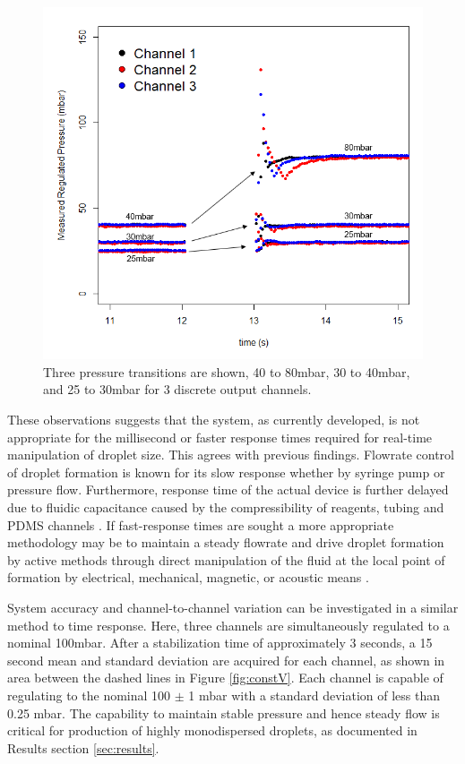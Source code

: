 \begin{figure}[H]
\centering 
\includegraphics[width=01.0\columnwidth]{timeResponse.PNG} 
\caption[PDFC time response]{Three pressure transitions are shown, 40 to 80mbar, 30 to 40mbar, and 25 to 30mbar for 3 discrete output channels. } 
\label{fig:timeResponse} 
\end{figure}

These observations suggests that the system, as currently developed, is not appropriate for the millisecond or faster response times required for real-time manipulation of droplet size. This agrees with previous findings. Flowrate control of droplet formation is known for its slow response whether by syringe pump or pressure flow. Furthermore, response time of the actual device is further delayed due to fluidic capacitance caused by the compressibility of reagents, tubing and PDMS channels \cite{Churski2013,Stone2004}. If fast-response times are sought a more appropriate methodology may be to maintain a steady flowrate and drive droplet formation by active methods through direct manipulation of the fluid at the local point of formation by electrical, mechanical, magnetic, or acoustic means \cite{Chong2016}.


System accuracy and channel-to-channel variation can be investigated in a similar method to time response. Here, three channels are simultaneously regulated to a nominal 100mbar. After a stabilization time of approximately 3 seconds, a 15 second mean and standard deviation are acquired for each channel, as shown in area between the dashed lines in Figure \vref{fig:constV}. Each channel is capable of regulating to the nominal 100 $\pm$ 1 mbar with a standard deviation of less than 0.25 mbar. The capability to maintain stable pressure and hence steady flow is critical for production of highly monodispersed droplets, as documented in Results section \ref{sec:results}.


